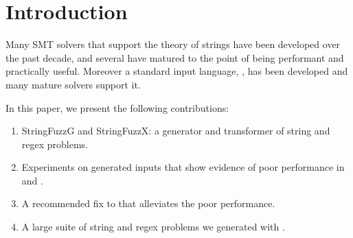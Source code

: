 \section{Introduction}

    Many SMT solvers that support the theory of strings have been developed over the past decade, and several have matured to the point of being performant and practically useful. Moreover a standard input language, \smt{}, has been developed and many mature solvers support it.

    In this paper, we present the following contributions:

    \begin{enumerate}
        \item StringFuzzG and StringFuzzX: a generator and transformer of \smt{} string and regex problems.
        \item Experiments on generated inputs that show evidence of poor performance in \us{} and \cvc{}.
        \item A recommended fix to \us{} that alleviates the poor performance.
        \item A large suite of \smt{} string and regex problems we generated with \fuzzer{}.
    \end{enumerate}

